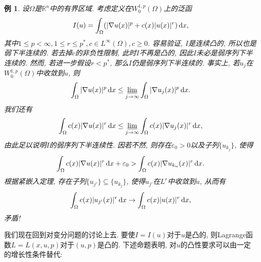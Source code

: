 \documentclass[12pt,a4paper]{article}
\newtheorem{example}[theorem]{例}
\begin{document}
\begin{example}\label{ex2.30}
    设$\Omega$是$\mathbb{R}^n$中的有界区域. 考虑定义在$W_0^{1, p}(\Omega)$上的泛函
    \begin{equation*}
        I(u) = \int_{\Omega}(|\nabla u(x)|^p + c(x)|u(x)|^r) \,{\rm d}x,
    \end{equation*}
    其中$1 \leq p < \infty, 1 \leq r \leq p^*, c \in L^{\infty}(\Omega), c \geq 0$.
    容易验证, $I$是连续凸的, 所以也是弱下半连续的. 若去掉$c$的非负性限制, 此时$I$不再是凸的, 因此$I$未必是弱序列下半连续的.
    然而, 若进一步假设$r < p^*$, 那么$I$仍是弱序列下半连续的. 事实上, 若$u_j$在$W_0^{1, p}(\Omega)$中收敛到$u$, 则 
    \begin{equation*}
        \int_{\Omega}|\nabla u(x)|^p \,{\rm d}x \leq \varliminf\limits_{j \rightarrow \infty}\int_{\Omega}|\nabla u_j(x)|^p \,{\rm d}x.
    \end{equation*}
    我们还有 
    \begin{equation*}
        \int_{\Omega}c(x)|\nabla u(x)|^r \,{\rm d}x \leq \varliminf\limits_{j \rightarrow \infty}\int_{\Omega}c(x)|\nabla u_j(x)|^r \,{\rm d}x,
    \end{equation*}
    由此足以说明$I$的弱序列下半连续性. 因若不然, 则存在$\varepsilon_0 > 0$以及子列$\{u_{k_j}\}$, 使得 
    \begin{equation*}
        \int_{\Omega}c(x)|\nabla u(x)|^r \,{\rm d}x + \varepsilon_0 > \int_{\Omega}c(x)|\nabla u_{k_n}(x)|^r \,{\rm d}x.
    \end{equation*}
    根据紧嵌入定理, 存在子列$\{u_{j'}\} \subseteq \{u_{k_j}\}$, 使得$u_{j'}$在$L^r$中收敛到$u$, 从而有 
    \begin{equation*}
        \int_{\Omega}c(x)|u_{j'}(x)|^r \,{\rm d}x \rightarrow \int_{\Omega}c(x)|u(x)|^r \,{\rm d}x,
    \end{equation*}
    矛盾!
\end{example}

我们现在回到对变分问题的讨论上去. 要使$I = I(u)$对于$u$是凸的, 则Lagrange函数$L = L(x, u, p)$对于$(u, p)$是凸的. 
下述命题表明, 对$u$的凸性要求可以由一定的增长性条件替代:
\end{document}
